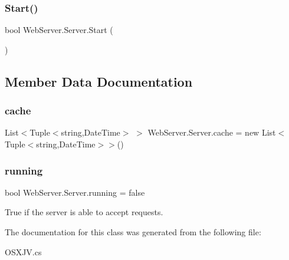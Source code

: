 \subsubsection{\texorpdfstring{Start()}{Start()}}
{\footnotesize\ttfamily bool Web\+Server.\+Server.\+Start (\begin{DoxyParamCaption}{ }\end{DoxyParamCaption})}







\subsection{Member Data Documentation}
\mbox{\label{class_web_server_1_1_server_afe0b135529c6978a1807634318656d2a}} 
\subsubsection{\texorpdfstring{cache}{cache}}
{\footnotesize\ttfamily List$<$Tuple$<$string,Date\+Time$>$ $>$ Web\+Server.\+Server.\+cache = new List$<$Tuple$<$string,Date\+Time$>$$>$()\hspace{0.3cm}{\ttfamily [static]}}





\mbox{\label{class_web_server_1_1_server_aea270e1d81ce0cd9fab583d7c5b3d607}} 
\subsubsection{\texorpdfstring{running}{running}}
{\footnotesize\ttfamily bool Web\+Server.\+Server.\+running = false\hspace{0.3cm}{\ttfamily [static]}}



True if the server is able to accept requests. 



The documentation for this class was generated from the following file\+:\begin{DoxyCompactItemize}
\item 
O\+S\+X\+J\+V.\+cs\end{DoxyCompactItemize}
